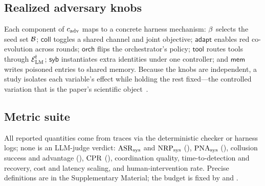 \subsection{Realized adversary knobs}
Each component of $c_{\mathrm{adv}}$ maps to a concrete harness mechanism:
$\beta$ selects the seed set $\mathcal{B}$; $\mathsf{coll}$ toggles a shared channel and
joint objective; $\mathsf{adapt}$ enables red co-evolution across \corb{} rounds;
$\mathsf{orch}$ flips the orchestrator's policy; $\mathsf{tool}$ routes tools through
$\mathcal{E}_{\mathrm{LM}}^{\!\dagger}$; $\mathsf{syb}$ instantiates extra identities under one controller; and
$\mathsf{mem}$ writes poisoned entries to shared memory. Because the knobs are independent,
a study isolates each variable's effect while holding the rest fixed---the controlled
variation that is the paper's scientific object~\cite{rubin1974estimating}.

\subsection{Metric suite}
\label{sec:metric-suite}
All reported quantities come from traces via the deterministic checker or harness logs;
none is an LLM-judge verdict: $\mathrm{ASR}_{\mathrm{sys}}$ and $\mathrm{NRP}_{\mathrm{sys}}$ (), $\mathrm{PNA}_{\mathrm{sys}}$
(), collusion success and advantage (), $\mathrm{CPR}$
(), coordination quality, time-to-detection and recovery, cost and latency
scaling, and human-intervention rate. Precise definitions are in the Supplementary
Material; the budget is fixed by  and .